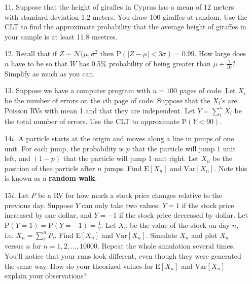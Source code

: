 \documentclass[10pt]{extarticle}
\newcommand{\E}{\text{E}}
\newcommand{\Var}{\text{Var}}
\renewcommand{\P}{\text{P}}
\begin{document}
\begin{itemize}

	\item[11.] Suppose that the height of giraffes in Cyprus has a mean of 12 meters with standard deviation 1.2 meters. You draw 100 giraffes at random. Use the CLT to find the approximate probability that the average height of giraffes in your sample is at least 11.8 meetres. \\ 

	\item[12.] Recall that if $Z \sim \mathcal N(\mu, \sigma^2$ then $\P(| Z - \mu| < 3\sigma) = 0.99$. How large does $n$ have to be so that $\bar W$ has 0.5\% probability of being greater than $\mu + \frac{1}{10}$? Simplify as much as you can. \\ 

	\item[13.] Suppose we have a computer program with $n=100$ pages of code. Let $X_i$ be the number of errors on the $i$th page of code. Suppose that the $X_i$'s are Poisson RVs with mean 1 and that they are independent. Let $Y = \sum_i^n X_i$ be the total number of errors. Use the CLT to approximate $\P(Y < 90)$. \\ 

	\item[14$i$.] A particle starts at the origin and moves along a line in jumps of one unit. For each jump, the probability is $p$ that the particle will jump 1 unit left, and $(1-p)$ that  the particle will jump 1 unit right. Let $X_n$ be the position of thee particle after $n$ jumps. Find $\E[X_n]$ and $\Var[X_n]$. Note this is known as a {\bf random walk}. \\ 

	\item[15$i$.] Let $P$ be a RV for how much a stock price changes relative to the previous day. Suppose $Y$ can only take two values:  $Y=1$ if the stock price increased by one dollar, and $Y=-1$ if the stock price decreased by dollar. Let $\P (Y=1) = \P (Y=-1) = \frac 12$. Let $X_n$ be the value of the stock on day $n$, i.e. $X_n = \sum_i^n P_i$. Find $\E[X_n]$ and $\Var[X_n]$. Simulate $X_n$ and plot $X_n$ versus $n$ for $n = 1,2,...,10000$. Repeat the whole simulation several times. You'll notice that your runs look different, even though they were generated the same way. How do your theorized values for $\E[X_n]$ and $\Var[X_n]$ explain your observations?  

\end{itemize}
\end{document}
